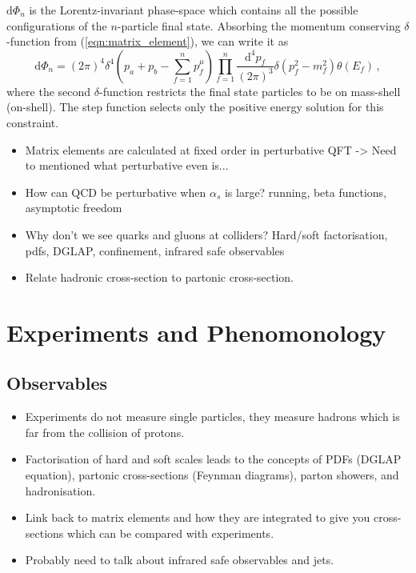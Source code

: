 \documentclass[main.tex]{subfiles}
\begin{document}
    $\mathrm{d}\Phi_{n}$ is the Lorentz-invariant
    phase-space which contains all the possible
    configurations of the $n$-particle final state.
    Absorbing the momentum conserving $\delta$-function
    from (\ref{eqn:matrix_element}),
    we can write it as
    \begin{equation}\label{eqn:dlips_4d}
        \mathrm{d}\Phi_{n} = (2\pi)^{4}\delta^{4}\left(p_{a} + p_{b} - \sum_{f=1}^{n} p_{f}^{\mu}\right) \prod_{f=1}^{n} \dfrac{\mathrm{d}^{4}p_{f}}{(2\pi)^{3}}\delta(p_{f}^{2} - m_{f}^{2})\theta(E_{f}) \, ,
    \end{equation}
    where the second $\delta$-function restricts
    the final state particles to be on mass-shell
    (on-shell). The step function selects only
    the positive energy solution for this constraint.
    \begin{itemize}
        \item Matrix elements are calculated at fixed order in perturbative QFT -> Need to mentioned what perturbative even is...
        \item How can QCD be perturbative when $\alpha_{s}$ is large? running, beta functions, asymptotic freedom
        \item Why don't we see quarks and gluons at colliders? Hard/soft factorisation, pdfs, DGLAP, confinement, infrared safe observables
        \item Relate hadronic cross-section to partonic cross-section.
    \end{itemize}

\section{Experiments and Phenomonology}
\subsection{Observables}
\begin{itemize}
    \item Experiments do not measure single particles,
    they measure hadrons which is far from the collision
    of protons.
    \item Factorisation of hard and soft scales leads
    to the concepts of PDFs (DGLAP equation), partonic
    cross-sections (Feynman diagrams), parton showers,
    and hadronisation.
    \item Link back to matrix elements and how they
    are integrated to give you cross-sections which
    can be compared with experiments.
    \item Probably need to talk about infrared safe
    observables and jets.
\end{itemize}
\end{document}
